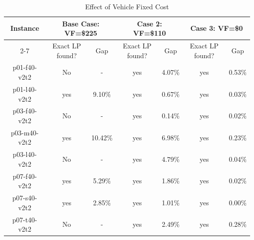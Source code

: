 \begin{table}[h!tbp]
\centering
\caption{Effect of Vehicle Fixed Cost}\label{CompVehFixedC}
\begin {tabular}[t]{|c|c|c|c|c|c|c|}  
\hline 
Instance & \multicolumn{2}{|c|}{Base Case: VF=\$225} &  \multicolumn{2}{|c|}{Case 2: VF=\$110}	&  \multicolumn{2}{|c|}{Case 3: VF=\$0} \\\cline{2-7}
\mbox{} & Exact LP found? & Gap & Exact LP found? & Gap & Exact LP found? & Gap \\\hline

p01-f40-v2t2	&	No	&	-	&	yes	&	4.07\%	&	yes	&	0.53\%	\\
p01-l40-v2t2	&	yes	&	9.10\%	&	yes	&	0.67\%	&	yes	&	0.03\%	\\
p03-f40-v2t2	&	No	&	-	&	yes	&	0.14\%	&	yes	&	0.02\%	\\
p03-m40-v2t2	&	yes	&	10.42\%	&	yes	&	6.98\%	&	yes	&	0.23\%	\\
p03-l40-v2t2	&	No	&	-	&	yes	&	4.79\%	&	yes	&	0.04\%	\\
p07-f40-v2t2	&	yes	&	5.29\%	&	yes	&	1.86\%	&	yes	&	0.02\%	\\
p07-s40-v2t2	&	yes	&	2.85\%	&	yes	&	1.01\%	&	yes	&	0.00\%	\\
p07-t40-v2t2	&	No	&	-	&	yes	&	2.49\%	&	yes	&	0.28\%	\\\hline
\end{tabular}
\end{table}  





